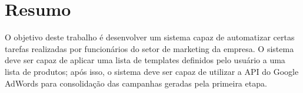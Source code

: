 \chapter*{Resumo}

\begin{doublespace}
    \noindent O objetivo deste trabalho é desenvolver um sistema
    capaz de automatizar certas tarefas realizadas por
    funcionários do setor de marketing da empresa. O sistema deve
    ser capaz de aplicar uma lista de templates definidos pelo
    usuário a uma lista de produtos; após isso, o sistema deve
    ser capaz de utilizar a API do Google AdWords para
    consolidação das campanhas geradas pela primeira etapa.
\end{doublespace}

